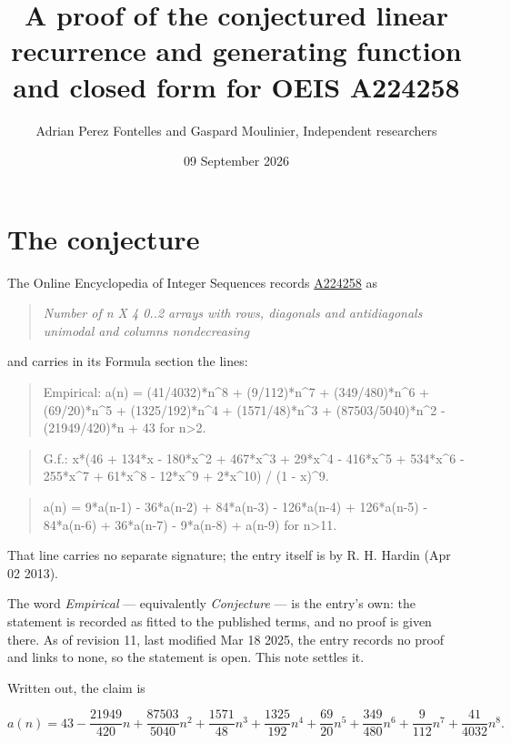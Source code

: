 \documentclass[11pt]{article}
\title{A proof of the conjectured linear recurrence and generating function and closed form for OEIS A224258}
\author{Adrian Perez Fontelles and Gaspard Moulinier, Independent researchers}
\date{09 September 2026}
\theoremstyle{definition}
\begin{document}
\maketitle
\section{The conjecture}

The Online Encyclopedia of Integer Sequences records \href{https://oeis.org/A224258}{A224258} as

\begin{quote}\itshape Number of n X 4 0..2 arrays with rows, diagonals and antidiagonals unimodal and columns nondecreasing\end{quote}

and carries in its Formula section the lines:

\begin{quote}\ttfamily Empirical: a(n) = (41/4032)*n\textasciicircum{}8 + (9/112)*n\textasciicircum{}7 + (349/480)*n\textasciicircum{}6 + (69/20)*n\textasciicircum{}5 + (1325/192)*n\textasciicircum{}4 + (1571/48)*n\textasciicircum{}3 + (87503/5040)*n\textasciicircum{}2 - (21949/420)*n + 43 for n>2.\end{quote}

\begin{quote}\ttfamily G.f.: x*(46 + 134*x - 180*x\textasciicircum{}2 + 467*x\textasciicircum{}3 + 29*x\textasciicircum{}4 - 416*x\textasciicircum{}5 + 534*x\textasciicircum{}6 - 255*x\textasciicircum{}7 + 61*x\textasciicircum{}8 - 12*x\textasciicircum{}9 + 2*x\textasciicircum{}10) / (1 - x)\textasciicircum{}9.\end{quote}

\begin{quote}\ttfamily a(n) = 9*a(n-1) - 36*a(n-2) + 84*a(n-3) - 126*a(n-4) + 126*a(n-5) - 84*a(n-6) + 36*a(n-7) - 9*a(n-8) + a(n-9) for n>11.\end{quote}

That line carries no separate signature; the entry itself is by R. H. Hardin (Apr 02 2013).

The word {\itshape Empirical} --- equivalently {\itshape Conjecture} --- is the entry's own: the statement is recorded as fitted to the published terms, and no proof is given there. As of revision 11, last modified Mar 18 2025, the entry records no proof and links to none, so the statement is open. This note settles it.

Written out, the claim is

\[a(n) = 43 - \frac{21949}{420}n + \frac{87503}{5040}n^{2} + \frac{1571}{48}n^{3} + \frac{1325}{192}n^{4} + \frac{69}{20}n^{5} + \frac{349}{480}n^{6} + \frac{9}{112}n^{7} + \frac{41}{4032}n^{8}.\]
\end{document}
